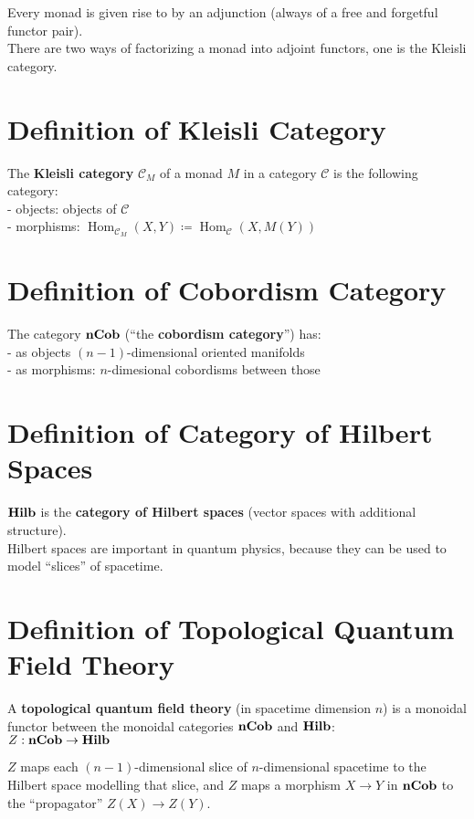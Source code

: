 \documentclass[a4paper, twoside, english, 11pt]{book}
\DeclareMathOperator{\Hom}{Hom}
\newcommand{\C}{\mathcal C}
\newcommand{\catname}[1]{{\normalfont\textbf{#1}}}
\newcommand{\nCob}{\catname{nCob}}
\newcommand{\Hilb}{\catname{Hilb}}
\begin{document}
\noindent
Every monad is given rise to by an adjunction (always of a free and forgetful functor pair). \\
There are two ways of factorizing a monad into adjoint functors, one is the Kleisli category.



\section{Definition of Kleisli Category}

The \textbf{Kleisli category} $\C_M$ of a monad $M$ in a category $\C$ is the following category: \\

- objects: objects of $\C$ \\

- morphisms: $\Hom_{\C_M}(X, Y) \coloneqq \Hom_\C(X, M(Y))$



\section{Definition of Cobordism Category}

The category $\nCob$ (``the \textbf{cobordism category}'') has: \\

- as objects $(n - 1)$-dimensional oriented manifolds \\

- as morphisms: $n$-dimesional cobordisms between those



\section{Definition of Category of Hilbert Spaces}

$\Hilb$ is the \textbf{category of Hilbert spaces} (vector spaces with additional structure). \\

\noindent
Hilbert spaces are important in quantum physics, because they can be used to model ``slices'' of spacetime.



\section{Definition of Topological Quantum Field Theory}

A \textbf{topological quantum field theory} (in spacetime dimension $n$) is a monoidal functor between the monoidal categories $\nCob$ and $\Hilb$: \\

$Z : \nCob \rightarrow \Hilb$ \\

\noindent

$Z$ maps each $(n - 1)$-dimensional slice of $n$-dimensional spacetime to the Hilbert space modelling that slice, and $Z$ maps a morphism $X \rightarrow Y$ in $\nCob$ to the ``propagator'' $Z(X) \rightarrow Z(Y)$.
\end{document}

